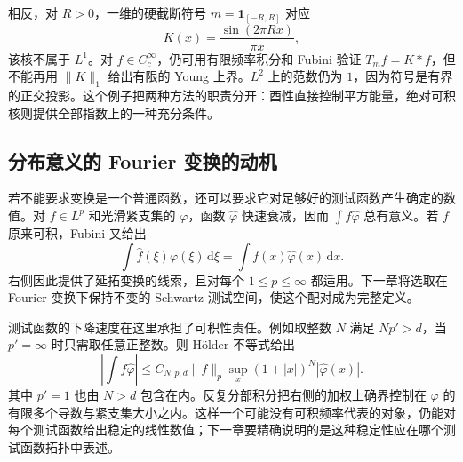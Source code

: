 \ProseParagraphBreak

相反，对 \(R>0\)，一维的硬截断符号 \(m=\mathbf1_{[-R,R]}\) 对应
\[
 K(x)=\dfrac{\sin(2\pi Rx)}{\pi x},
\]
该核不属于 \(L^1\)。对 \(f\in C_c^\infty\)，仍可用有限频率积分和 Fubini 验证 \(T_mf=K*f\)，但不能再用 \(\|K\|_1\) 给出有限的 Young 上界。\(L^2\) 上的范数仍为 \(1\)，因为符号是有界的正交投影。这个例子把两种方法的职责分开：酉性直接控制平方能量，绝对可积核则提供全部指数上的一种充分条件。

\subsection{分布意义的 Fourier 变换的动机}
\label{b2:subsec:040304}

若不能要求变换是一个普通函数，还可以要求它对足够好的测试函数产生确定的数值。对 \(f\in L^p\) 和光滑紧支集的 \(\varphi\)，函数 \(\widehat\varphi\) 快速衰减，因而 \(\int f\widehat\varphi\) 总有意义。若 \(f\) 原来可积，Fubini 又给出
\[
 \int\widehat f(\xi)\varphi(\xi)\,\mathrm{d}\xi
 =\int f(x)\widehat\varphi(x)\,\mathrm{d}x.
\]
右侧因此提供了延拓变换的线索，且对每个 \(1\leq p\leq\infty\) 都适用。下一章将选取在 Fourier 变换下保持不变的 Schwartz 测试空间，使这个配对成为完整定义。

\ProseParagraphBreak

测试函数的下降速度在这里承担了可积性责任。例如取整数 \(N\) 满足 \(Np'>d\)，当 \(p'=\infty\) 时只需取任意正整数。则 Hölder 不等式给出
\[
 \left|\int f\widehat\varphi\right|
 \leq C_{N,p,d}\|f\|_p
 \sup_x(1+|x|)^N|\widehat\varphi(x)|.
\]
其中 \(p'=1\) 也由 \(N>d\) 包含在内。反复分部积分把右侧的加权上确界控制在 \(\varphi\) 的有限多个导数与紧支集大小之内。这样一个可能没有可积频率代表的对象，仍能对每个测试函数给出稳定的线性数值；下一章要精确说明的是这种稳定性应在哪个测试函数拓扑中表述。
